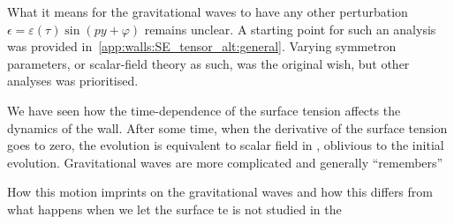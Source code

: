 







What it means for the gravitational waves to have any other perturbation $\epsilon= \varepsilon(\tau) \sin{(py + \varphi)}$ remains unclear. A starting point for such an analysis was provided in~\cref{app:walls:SE_tensor_alt:general}. Varying symmetron parameters, or scalar-field theory as such, was the original wish, but other analyses was prioritised. 

We have seen how the time-dependence of the surface tension affects the dynamics of the wall. After some time, when the derivative of the surface tension goes to zero, the evolution is equivalent to scalar field in \blahblah, oblivious to the initial evolution. 
Gravitational waves are more complicated and generally ``remembers'' 

How this motion imprints on the gravitational waves and how this differs from what happens when we let the surface te is not studied in the 






